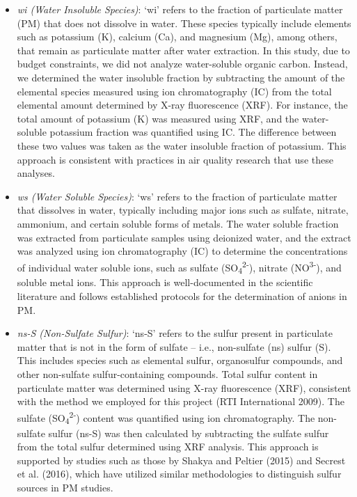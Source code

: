 \documentclass[
  letterpaper,
  DIV=11,
  numbers=noendperiod]{scrartcl}
\begin{document}
\begin{itemize}
\item
  \emph{wi (Water Insoluble Species)}: `wi' refers to the fraction of
  particulate matter (PM) that does not dissolve in water. These species
  typically include elements such as potassium (K), calcium (Ca), and
  magnesium (Mg), among others, that remain as particulate matter after
  water extraction. In this study, due to budget constraints, we did not
  analyze water-soluble organic carbon. Instead, we determined the water
  insoluble fraction by subtracting the amount of the elemental species
  measured using ion chromatography (IC) from the total elemental amount
  determined by X-ray fluorescence (XRF). For instance, the total amount
  of potassium (K) was measured using XRF, and the water-soluble
  potassium fraction was quantified using IC. The difference between
  these two values was taken as the water insoluble fraction of
  potassium. This approach is consistent with practices in air quality
  research that use these analyses.
\item
  \emph{ws (Water Soluble Species)}: `ws'  refers to the
  fraction of particulate matter that dissolves in water, typically
  including major ions such as sulfate, nitrate, ammonium, and certain
  soluble forms of metals. The water soluble fraction was extracted from
  particulate samples using deionized water, and the extract was
  analyzed using ion chromatography (IC) to determine the concentrations
  of individual water soluble ions, such as sulfate
  (SO\textsubscript{4}\textsuperscript{2-}), nitrate
  (NO\textsuperscript{3-}), and soluble metal ions. This approach is
  well-documented in the scientific literature and follows established
  protocols for the determination of anions in PM.
\item
  \emph{ns-S (Non-Sulfate Sulfur)}: `ns-S' refers to the sulfur present
  in particulate matter that is not in the form of sulfate -- i.e.,
  non-sulfate (ns) sulfur (S). This includes species such as elemental
  sulfur, organosulfur compounds, and other non-sulfate
  sulfur-containing compounds. Total sulfur content in particulate
  matter was determined using X-ray fluorescence (XRF), consistent with
  the method we employed for this project (RTI International 2009). The
  sulfate (SO\textsubscript{4}\textsuperscript{2-}) content was
  quantified using ion chromatography. The non-sulfate sulfur (ns-S) was
  then calculated by subtracting the sulfate sulfur from the total
  sulfur determined using XRF analysis. This approach is supported by
  studies such as those by Shakya and Peltier (2015) and Secrest et al.
  (2016), which have utilized similar methodologies to distinguish
  sulfur sources in PM studies.
\end{itemize}
\end{document}
